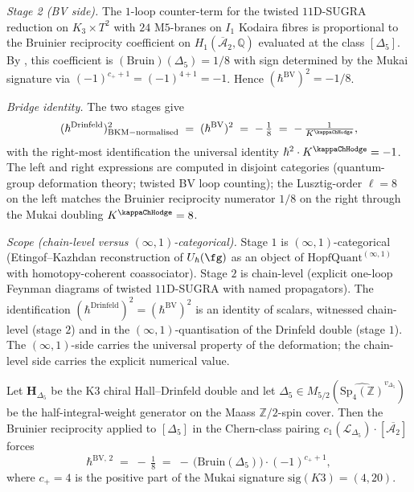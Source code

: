 \begin{remark}[Two-$\hbar$ bridge: Drinfeld $\hbar$ versus BV $\hbar$ at $\hbar^2 = -1/8$]
\noindent\emph{Stage 2 (BV side).} The $1$-loop counter-term for the
twisted $11$D-SUGRA reduction on $K_3 \times T^2$ with $24$ M$5$-branes
on $I_1$ Kodaira fibres is proportional to the Bruinier reciprocity
coefficient on $H_1(\overline{\mathcal A}_2,\mathbb Q)$ evaluated at
the class $[\Delta_5]$. By
\cite[Prop.~9.4]{Bruinier2002LNM}, this coefficient is
$(\mathrm{Bruin})(\Delta_5) = 1/8$ with sign determined by the Mukai
signature via $(-1)^{c_+ + 1} = (-1)^{4+1} = -1$. Hence
$(\hbar^{\mathrm{BV}})^2 = -1/8$.

\noindent\emph{Bridge identity.} The two stages give
\begin{equation}
\label{eq:dgsfb-two-hbar-bridge-eq}
 (\hbar^{\mathrm{Drinfeld}})^2_{\mathrm{BKM-normalised}}
 \;=\; (\hbar^{\mathrm{BV}})^2
 \;=\; -\,\tfrac{1}{8}
 \;=\; -\,\tfrac{1}{K^{\kappaChHodge}},
\end{equation}
with the right-most identification the universal identity
$\hbar^2 \cdot K^{\kappaChHodge} = -1$. The left and right expressions
are computed in disjoint categories (quantum-group deformation theory;
twisted BV loop counting); the Lusztig-order $\ell = 8$ on the left
matches the Bruinier reciprocity numerator $1/8$ on the right through
the Mukai doubling $K^{\kappaChHodge} = 8$.

\noindent\emph{Scope (chain-level versus $(\infty,1)$-categorical).}
Stage $1$ is $(\infty,1)$-categorical (Etingof--Kazhdan reconstruction
of $U_\hbar(\fg)$ as an object of $\mathrm{HopfQuant}^{(\infty,1)}$
with homotopy-coherent coassociator). Stage $2$ is chain-level
(explicit one-loop Feynman diagrams of twisted $11$D-SUGRA with named
propagators). The identification
$(\hbar^{\mathrm{Drinfeld}})^2 = (\hbar^{\mathrm{BV}})^2$ is an
identity of scalars, witnessed chain-level (stage $2$) and in the
$(\infty,1)$-quantisation of the Drinfeld double (stage $1$). The
$(\infty,1)$-side carries the universal property of the deformation;
the chain-level side carries the explicit numerical value.
\end{remark}

\begin{proposition}[$\kappaChHodge$-Bruinier reciprocity as the forcing mechanism of $\hbar^2 = -1/8$]
\label{prop:dgsfb-kappa-bruinier-reciprocity}
Let $\mathbf H_{\Delta_5}$ be the K$3$ chiral Hall--Drinfeld double
and let $\Delta_5 \in M_{5/2}(\widehat{\mathrm{Sp}_4(\mathbb Z)}^{v_{\Delta_5}})$ be
the half-integral-weight generator on the Maass $\mathbb Z/2$-spin
cover. Then the Bruinier reciprocity
\cite[Thm.~9.3, Prop.~9.4]{Bruinier2002LNM} applied to $[\Delta_5]$ in
the Chern-class pairing
$c_1(\mathcal L_{\Delta_5}) \cdot [\overline{\mathcal A_2}]$ forces
\begin{equation}
\label{eq:dgsfb-bruinier-forcing}
 \hbar^{\mathrm{BV},\,2}
 \;=\; -\,\tfrac{1}{8}
 \;=\; -\,\bigl(\mathrm{Bruin}(\Delta_5)\bigr)\cdot (-1)^{c_+ + 1},
\end{equation}
where $c_+ = 4$ is the positive part of the Mukai signature
$\mathrm{sig}(K3) = (4, 20)$.
\end{proposition}

